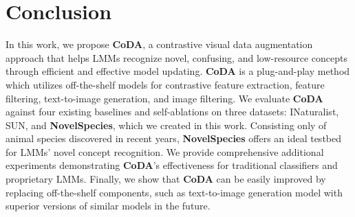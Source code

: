 \section{Conclusion}
\label{sec:conclusion}

In this work, we propose \textbf{CoDA}, a contrastive visual data augmentation approach that helps LMMs recognize novel, confusing, and low-resource concepts through efficient and effective model updating. \textbf{CoDA} is a plug-and-play method which utilizes off-the-shelf models for contrastive feature extraction, feature filtering, text-to-image generation, and image filtering. We evaluate \textbf{CoDA} against four existing baselines and self-ablations on three datasets: INaturalist, SUN, and \textbf{NovelSpecies}, which we created in this work. Consisting only of animal species discovered in recent years, \textbf{NovelSpecies} offers an ideal testbed for LMMs' novel concept recognition. We provide comprehensive additional experiments demonstrating \textbf{CoDA}'s effectiveness for traditional classifiers and proprietary LMMs. Finally, we show that \textbf{CoDA} can be easily improved by replacing off-the-shelf components, such as text-to-image generation model with superior versions of similar models in the future.
